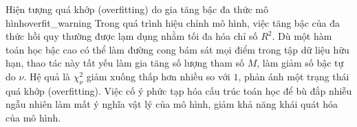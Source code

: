  \begin{pitfall}{Hiện tượng quá khớp (overfitting) do gia tăng bậc đa thức mô hình}{overfit_warning}
Trong quá trình hiệu chỉnh mô hình, việc tăng bậc của đa thức hồi quy thường được lạm dụng nhằm tối đa hóa chỉ số $R^2$. Dù một hàm toán học bậc cao có thể làm đường cong bám sát mọi điểm trong tập dữ liệu hữu hạn, thao tác này tất yếu làm gia tăng số lượng tham số $M$, làm giảm số bậc tự do $\nu$. Hệ quả là $\chi^2_\nu$ giảm xuống thấp hơn nhiều so với $1$, phản ánh một trạng thái quá khớp (overfitting). Việc cố ý phức tạp hóa cấu trúc toán học để bù đắp nhiễu ngẫu nhiên làm mất ý nghĩa vật lý của mô hình, giảm khả năng khái quát hóa của mô hình.
\end{pitfall}